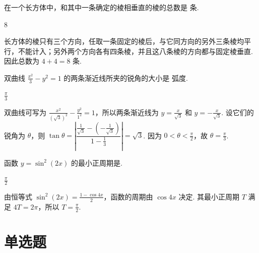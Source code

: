 \documentclass[UTF8,a4paper,oneside,11pt]{ctexbook}
\begin{document}
\begin{problem}

在一个长方体中，和其中一条确定的棱相垂直的棱的总数是\fillinblank{} 条.
\begin{answer}
\(8\)
\end{answer}

\begin{solution}
长方体的棱只有三个方向，任取一条固定的棱后，与它同方向的另外三条棱均平行，不能计入；另外两个方向各有四条棱，并且这八条棱的方向都与固定棱垂直. 因此总数为 \(4+4=8\) 条.
\end{solution}
\end{problem}

\begin{problem}

双曲线 \(\frac{x^2}{3} - y^2 = 1\) 的两条渐近线所夹的锐角的大小是\fillinblank{} 弧度.
\begin{answer}
\(\frac{\pi}{3}\)
\end{answer}

\begin{solution}
双曲线可写为 \(\frac{x^{2}}{(\sqrt3)^{2}}-\frac{y^{2}}{1^{2}}=1\)，所以两条渐近线为 \(y=\frac{x}{\sqrt3}\) 和 \(y=-\frac{x}{\sqrt3}\). 设它们的锐角为 \(\theta\)，则
\(\tan\theta=\left|\dfrac{\frac1{\sqrt3}-(-\frac1{\sqrt3})}{1-\frac13}\right|=\sqrt3\). 因为 \(0<\theta<\frac\pi2\)，故 \(\theta=\frac\pi3\).
\end{solution}
\end{problem}

\begin{problem}

函数 \(y = \sin^{2}(2x) \) 的最小正周期是\fillinblank{}.
\begin{answer}
\(\frac{\pi}{2}\)
\end{answer}

\begin{solution}
由恒等式 \(\sin^{2}(2x)=\frac{1-\cos4x}{2}\)，函数的周期由 \(\cos4x\) 决定. 其最小正周期 \(T\) 满足 \(4T=2\pi\)，所以 \(T=\frac\pi2\).
\end{solution}
\end{problem}

\section{单选题}
\end{document}
